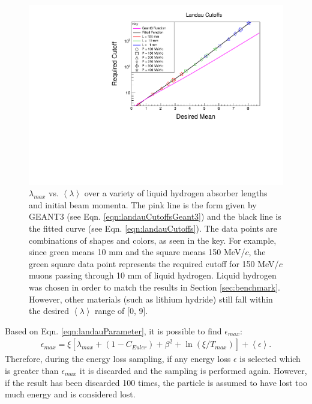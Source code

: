 \begin{figure}
  \centering
    \includegraphics[width=\textwidth]{Figures/landau_cutoffs} 
  \caption[$\lambda_{max}$ vs. $\left<\lambda\right>$ over a variety of liquid hydrogen absorber lengths and initial beam momenta.]{$\lambda_{max}$ vs. $\left<\lambda\right>$ over a variety of liquid hydrogen absorber lengths and initial beam momenta. The pink line is the form given by GEANT3 (see Eqn. \ref{eqn:landauCutoffsGeant3}) and the black line is the fitted curve (see Eqn. \ref{eqn:landauCutoffs}). The data points are combinations of shapes and colors, as seen in the key. For example, since green means 10 mm and the square means 150 MeV/$c$, the green square data point represents the required cutoff for 150 MeV/$c$ muons passing through 10 mm of liquid hydrogen. Liquid hydrogen was chosen in order to match the results in Section \ref{sec:benchmark}. However, other materials (such as lithium hydride) still fall within the desired $\left<\lambda\right>$ range of [0, 9].}
  \label{fig:landau_cutoffs}
\end{figure}

Based on Eqn. \ref{eqn:landauParameter}, it is possible to find $\epsilon_{max}$:
\begin{align*}
\epsilon_{max}=\xi[\lambda_{max}+(1-C_{Euler})+\beta^2+\ln(\xi/T_{max})]+\left<\epsilon\right>.
\end{align*}
Therefore, during the energy loss sampling, if any energy loss $\epsilon$ is selected which is greater than $\epsilon_{max}$ it is discarded and the sampling is performed again. However, if the result has been discarded 100 times, the particle is assumed to have lost too much energy and is considered lost.

